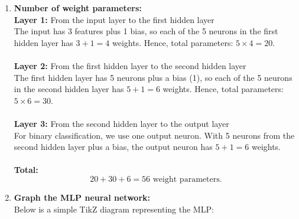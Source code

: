 \documentclass[12pt]{article}
\begin{document}
\begin{enumerate}[label=(\alph*)]
    \item \textbf{Number of weight parameters:} \\
    \textbf{Layer 1:} From the input layer to the first hidden layer \\
    The input has 3 features plus 1 bias, so each of the 5 neurons in the first hidden layer has \(3+1=4\) weights. Hence, total parameters: \(5 \times 4 = 20\). \\
    \\
    \textbf{Layer 2:} From the first hidden layer to the second hidden layer \\
    The first hidden layer has 5 neurons plus a bias (1), so each of the 5 neurons in the second hidden layer has \(5+1=6\) weights. Hence, total parameters: \(5 \times 6 = 30\). \\
    \\
    \textbf{Layer 3:} From the second hidden layer to the output layer \\
    For binary classification, we use one output neuron. With 5 neurons from the second hidden layer plus a bias, the output neuron has \(5+1=6\) weights. \\
    \\
    \textbf{Total:} \\
    \[
    20 + 30 + 6 = 56 \text{ weight parameters.}
    \]
    
    \item \textbf{Graph the MLP neural network:} \\
    Below is a simple TikZ diagram representing the MLP:
    
    \begin{center}
\end{center}
\end{enumerate}
\end{document}

